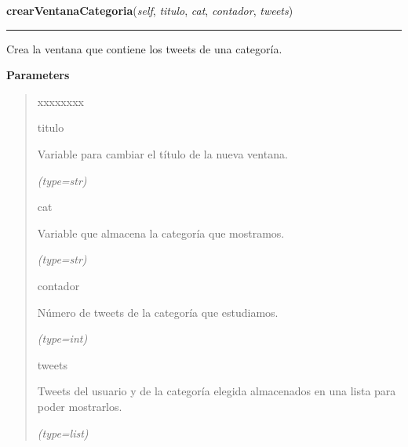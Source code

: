\hspace{.8\funcindent}\begin{boxedminipage}{\funcwidth}

    \raggedright \textbf{crearVentanaCategoria}(\textit{self}, \textit{titulo}, \textit{cat}, \textit{contador}, \textit{tweets})

    \vspace{-1.5ex}

    \rule{\textwidth}{0.5\fboxrule}
\setlength{\parskip}{2ex}
    Crea la ventana que contiene los tweets de una categoría.

\setlength{\parskip}{1ex}
      \textbf{Parameters}
      \vspace{-1ex}

      \begin{quote}
        \begin{Ventry}{xxxxxxxx}

          \item[titulo]

          Variable para cambiar el título de la nueva ventana.

            {\it (type=str)}

          \item[cat]

          Variable que almacena la categoría que mostramos.

            {\it (type=str)}

          \item[contador]

          Número de tweets de la categoría que estudiamos.

            {\it (type=int)}

          \item[tweets]

          Tweets del usuario y de la categoría elegida almacenados en una 
          lista para poder mostrarlos.

            {\it (type=list)}

        \end{Ventry}

      \end{quote}

    \end{boxedminipage}

    \label{creaVentanas:CreaVentanas:crearVentanaError}

